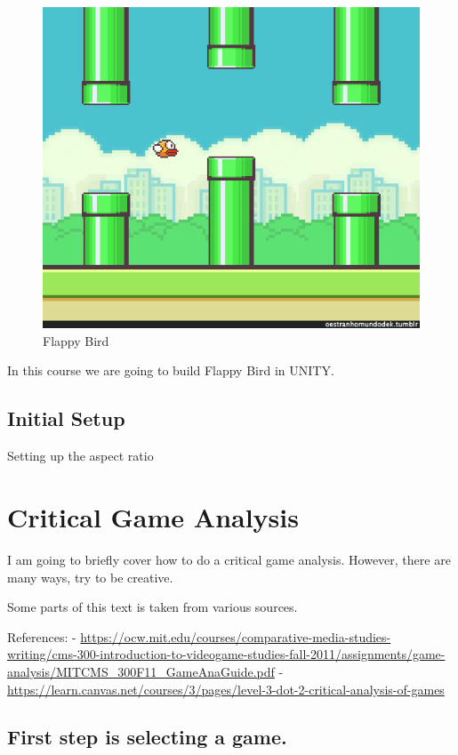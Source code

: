 \documentclass[
]{book}
\begin{document}
\begin{figure}
\centering
\includegraphics{Images/flappy.gif}
\caption{Flappy Bird}
\end{figure}

In this course we are going to build Flappy Bird in UNITY.

\hypertarget{initial-setup}{%
\section{Initial Setup}\label{initial-setup}}

Setting up the aspect ratio

\hypertarget{critical-game-analysis}{%
\chapter{Critical Game Analysis}\label{critical-game-analysis}}

I am going to briefly cover how to do a critical game analysis. However, there are many ways, try to be
creative.

Some parts of this text is taken from various sources.

References:
- \url{https://ocw.mit.edu/courses/comparative-media-studies-writing/cms-300-introduction-to-videogame-studies-fall-2011/assignments/game-analysis/MITCMS_300F11_GameAnaGuide.pdf}
- \url{https://learn.canvas.net/courses/3/pages/level-3-dot-2-critical-analysis-of-games}

\hypertarget{first-step-is-selecting-a-game.}{%
\section{First step is selecting a game.}\label{first-step-is-selecting-a-game.}}
\end{document}
